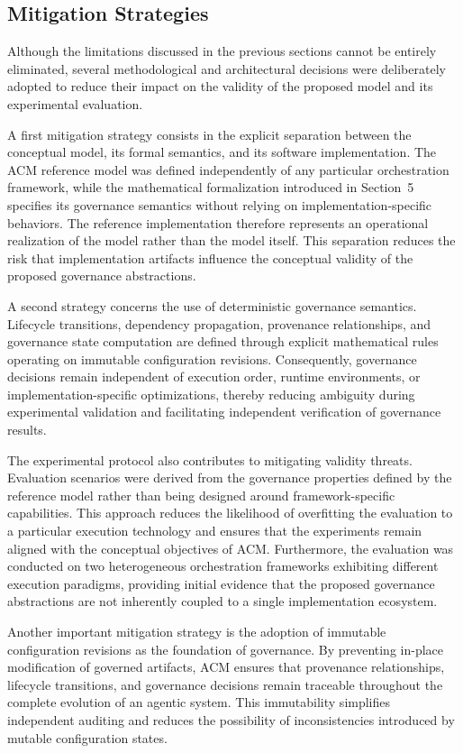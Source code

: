 \documentclass[10pt]{article}
\begin{document}
\subsection{Mitigation Strategies}

Although the limitations discussed in the previous sections cannot be entirely eliminated, several methodological and architectural decisions were deliberately adopted to reduce their impact on the validity of the proposed model and its experimental evaluation.

A first mitigation strategy consists in the explicit separation between the conceptual model, its formal semantics, and its software implementation. The ACM reference model was defined independently of any particular orchestration framework, while the mathematical formalization introduced in Section~5 specifies its governance semantics without relying on implementation-specific behaviors. The reference implementation therefore represents an operational realization of the model rather than the model itself. This separation reduces the risk that implementation artifacts influence the conceptual validity of the proposed governance abstractions.

A second strategy concerns the use of deterministic governance semantics. Lifecycle transitions, dependency propagation, provenance relationships, and governance state computation are defined through explicit mathematical rules operating on immutable configuration revisions. Consequently, governance decisions remain independent of execution order, runtime environments, or implementation-specific optimizations, thereby reducing ambiguity during experimental validation and facilitating independent verification of governance results.

The experimental protocol also contributes to mitigating validity threats. Evaluation scenarios were derived from the governance properties defined by the reference model rather than being designed around framework-specific capabilities. This approach reduces the likelihood of overfitting the evaluation to a particular execution technology and ensures that the experiments remain aligned with the conceptual objectives of ACM. Furthermore, the evaluation was conducted on two heterogeneous orchestration frameworks exhibiting different execution paradigms, providing initial evidence that the proposed governance abstractions are not inherently coupled to a single implementation ecosystem.

Another important mitigation strategy is the adoption of immutable configuration revisions as the foundation of governance. By preventing in-place modification of governed artifacts, ACM ensures that provenance relationships, lifecycle transitions, and governance decisions remain traceable throughout the complete evolution of an agentic system. This immutability simplifies independent auditing and reduces the possibility of inconsistencies introduced by mutable configuration states.
\end{document}
